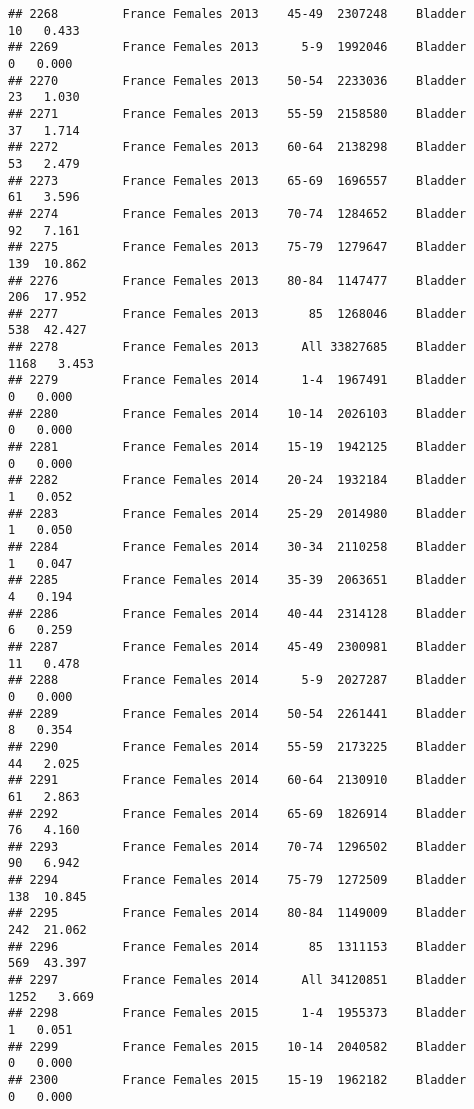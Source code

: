 \documentclass[
]{article}
\begin{document}
\begin{verbatim}
## 2268         France Females 2013    45-49  2307248    Bladder     10   0.433
## 2269         France Females 2013      5-9  1992046    Bladder      0   0.000
## 2270         France Females 2013    50-54  2233036    Bladder     23   1.030
## 2271         France Females 2013    55-59  2158580    Bladder     37   1.714
## 2272         France Females 2013    60-64  2138298    Bladder     53   2.479
## 2273         France Females 2013    65-69  1696557    Bladder     61   3.596
## 2274         France Females 2013    70-74  1284652    Bladder     92   7.161
## 2275         France Females 2013    75-79  1279647    Bladder    139  10.862
## 2276         France Females 2013    80-84  1147477    Bladder    206  17.952
## 2277         France Females 2013       85  1268046    Bladder    538  42.427
## 2278         France Females 2013      All 33827685    Bladder   1168   3.453
## 2279         France Females 2014      1-4  1967491    Bladder      0   0.000
## 2280         France Females 2014    10-14  2026103    Bladder      0   0.000
## 2281         France Females 2014    15-19  1942125    Bladder      0   0.000
## 2282         France Females 2014    20-24  1932184    Bladder      1   0.052
## 2283         France Females 2014    25-29  2014980    Bladder      1   0.050
## 2284         France Females 2014    30-34  2110258    Bladder      1   0.047
## 2285         France Females 2014    35-39  2063651    Bladder      4   0.194
## 2286         France Females 2014    40-44  2314128    Bladder      6   0.259
## 2287         France Females 2014    45-49  2300981    Bladder     11   0.478
## 2288         France Females 2014      5-9  2027287    Bladder      0   0.000
## 2289         France Females 2014    50-54  2261441    Bladder      8   0.354
## 2290         France Females 2014    55-59  2173225    Bladder     44   2.025
## 2291         France Females 2014    60-64  2130910    Bladder     61   2.863
## 2292         France Females 2014    65-69  1826914    Bladder     76   4.160
## 2293         France Females 2014    70-74  1296502    Bladder     90   6.942
## 2294         France Females 2014    75-79  1272509    Bladder    138  10.845
## 2295         France Females 2014    80-84  1149009    Bladder    242  21.062
## 2296         France Females 2014       85  1311153    Bladder    569  43.397
## 2297         France Females 2014      All 34120851    Bladder   1252   3.669
## 2298         France Females 2015      1-4  1955373    Bladder      1   0.051
## 2299         France Females 2015    10-14  2040582    Bladder      0   0.000
## 2300         France Females 2015    15-19  1962182    Bladder      0   0.000

\end{verbatim}
\end{document}
